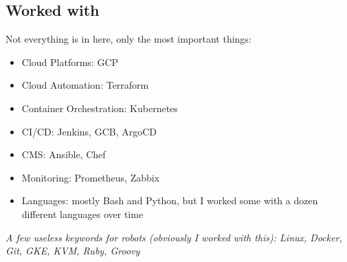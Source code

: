\documentclass[11pt, a4paper]{article}
\newcommand{\Delimitline}{
  \vspace{-2ex}
  \noindent\makebox[\linewidth]{\rule{\DelimitlineLength}{0.12ex}} }
\begin{document}
\vspace{0ex}


\subsection*{Worked with}
\Delimitline

Not everything is in here, only the most important things:
\begin{itemize}
  \item Cloud Platforms: GCP
  \item Cloud Automation: Terraform
  \item Container Orchestration: Kubernetes
  \item CI/CD: Jenkins, GCB, ArgoCD
  \item CMS: Ansible, Chef
  \item Monitoring: Prometheus, Zabbix
  \item Languages: mostly Bash and Python, but I worked some with a dozen different languages over time
\end{itemize}\vspace{2ex}

\textit{A few useless keywords for robots (obviously I worked with this): Linux, Docker, Git, GKE, KVM, Ruby, Groovy}
\end{document}

